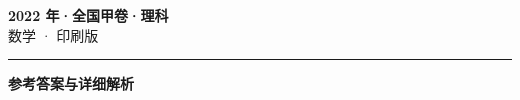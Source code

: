 \documentclass[zihao=5, a4paper]{ctexart}
\begin{document}
\begin{center}
  {\Large\bfseries 2022 年·全国甲卷·理科}\\[4pt]
  {\large 数学 · 印刷版}
\end{center}
\medskip
{}

\par\bigskip\hrule\bigskip
{}
\begin{center}{\large\bfseries 参考答案与详细解析}\end{center}
\smallskip

\end{document}
